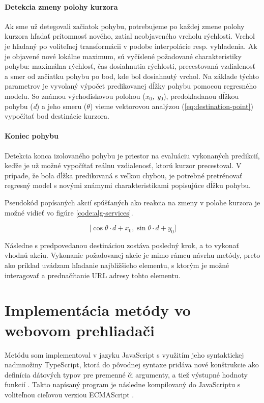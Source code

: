 \paragraph{Detekcia zmeny polohy kurzora} Ak sme už detegovali začiatok pohybu, potrebujeme po každej zmene polohy kurzora hľadať prítomnosť nového, zatiaľ neobjaveného vrcholu rýchlosti. Vrchol je hľadaný po voliteľnej transformácii v podobe interpolácie resp. vyhladenia. Ak je objavené nové lokálne maximum, sú vyčíslené požadované charakteristiky pohybu: maximálna rýchlosť, čas dosiahnutia rýchlosti, precestovaná vzdialenosť a smer od začiatku pohybu po bod, kde bol dosiahnutý vrchol. Na základe týchto parametrov je vyvolaný výpočet predikovanej dĺžky pohybu pomocou regresného modelu. So známou východiskovou polohou (\textit{$x_{0}$, y$_{0}$}), predokladanou dĺžkou pohybu (\textit{d}) a jeho smeru (\textit{$\theta$}) vieme vektorovou analýzou (\ref{eq:destination-point}) vypočítať bod destinácie kurzora. 

\paragraph{Koniec pohybu} Detekcia konca izolovaného pohybu je priestor na evaluáciu vykonaných predikcií, keďže je už možné vypočítať reálnu vzdialenosť, ktorú kurzor precestoval. V prípade, že bola dĺžka predikovaná s veľkou chybou, je potrebné pretrénovať regresný model s novými známymi charakteristikami popisujúce dĺžku pohybu.

Pseudokód popísaných akcií spúšťaných ako reakcia na zmeny v polohe kurzora je možné vidieť vo figúre \ref{code:alg-services}.

\begin{equation}
{\displaystyle \mathbf [\cos \theta \cdot d + x_{0},  \sin \theta \cdot d + y_{0}]}
\label{eq:destination-point}
\end{equation}

Následne s predpovedanou destináciou zostáva posledný krok, a to vykonať vhodnú akciu. Vykonanie požadovanej akcie je mimo rámcu návrhu metódy, preto ako príklad uvádzam hľadanie najbližšieho elementu, s ktorým je možné interagovať a prednačítanie URL adresy tohto elementu.

\section{Implementácia metódy vo webovom prehliadači} 
Metódu som implementoval v jazyku JavaScript s využitím jeho syntaktickej nadmnožiny TypeScript, ktorá do pôvodnej syntaxe pridáva nové konštrukcie ako definícia dátových typov pre premenné či argumenty, a tiež výstupné hodnoty funkcií \cite{microsoft:typescript}. Takto napísaný program je následne kompilovaný do JavaScriptu s voliteľnou cieľovou verziou ECMAScript \cite{zakas2016understanding}.

